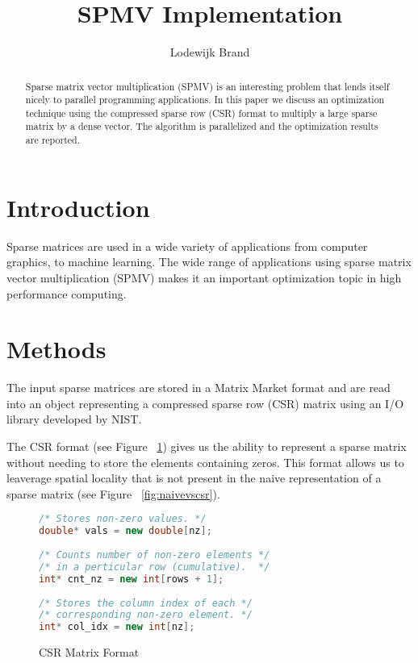 \documentclass[pageno]{jpaper}
\begin{document}
\title{
SPMV Implementation}
\author{
Lodewijk Brand}
\date{}
\maketitle


\thispagestyle{empty}

\begin{abstract}
Sparse matrix vector multiplication (SPMV) is an interesting problem that 
lends itself nicely to parallel programming applications. In this paper we 
discuss an optimization technique using the compressed sparse row (CSR)
format to multiply a large sparse matrix by a dense vector. The algorithm
is parallelized and the optimization results are reported.
\end{abstract}

\section{Introduction}
Sparse matrices are used in a wide variety of applications from  computer 
graphics, to machine learning. The wide range of applications using sparse
matrix vector multiplication (SPMV) makes it an important optimization topic
in high performance computing.

\section{Methods}
The input sparse matrices are stored in a Matrix Market format and are 
read into an object representing a compressed sparse row (CSR) matrix using
an I/O library developed by NIST\cite{matrixmarket}. 

The CSR format (see Figure ~\ref{fig:csrformat}) gives us the ability to represent a sparse matrix without 
needing to store the elements containing zeros. This format allows us
to leaverage spatial locality that is not present in the naive representation
of a sparse matrix (see Figure ~\ref{fig:naivevscsr}). 

\begin{figure}[b]
    \begin{lstlisting}[language=C++]
/* Stores non-zero values. */
double* vals = new double[nz];
    
/* Counts number of non-zero elements */
/* in a perticular row (cumulative).  */
int* cnt_nz = new int[rows + 1];  
    
/* Stores the column index of each */
/* corresponding non-zero element. */
int* col_idx = new int[nz];
    \end{lstlisting}
    \caption{CSR Matrix Format}
    \label{fig:csrformat}
\end{figure}
\end{document}
